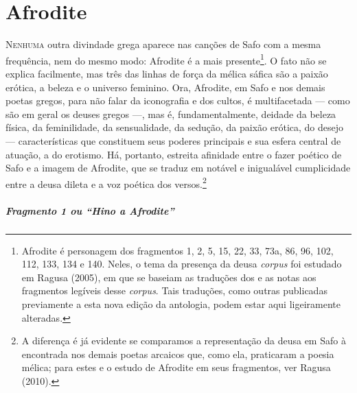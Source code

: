 \pagestyle{plain}



\chapter{Afrodite}

\textsc{Nenhuma} outra divindade grega aparece nas canções de Safo com a mesma
frequência, nem do mesmo modo: Afrodite é a mais presente\footnote{ Afrodite é
personagem dos fragmentos 1, 2, 5, 15, 22, 33, 73a, 86, 96, 102, 112, 133, 134
e 140. Neles, o tema da presença da deusa \textit{corpus} foi estudado em Ragusa (2005), em que se baseiam as traduções dos e as notas aos fragmentos legíveis desse \textit{corpus}. Tais traduções, como outras publicadas previamente a esta nova edição da antologia, podem estar aqui ligeiramente alteradas.}. O fato
não se explica facilmente, mas três das linhas de força da mélica sáfica são a
paixão erótica, a beleza e o universo feminino. Ora, Afrodite, em Safo e nos
demais poetas gregos, para não falar da iconografia e dos cultos, é
multifacetada --- como são em geral os deuses gregos ---, mas é, fundamentalmente,
deidade da beleza física, da feminilidade, da sensualidade, da sedução, da
paixão erótica, do desejo --- características que constituem seus poderes
principais e sua esfera central de atuação, a do erotismo. Há, portanto,
estreita afinidade entre o fazer poético de Safo e a imagem de Afrodite, que se
traduz em notável e inigualável cumplicidade entre a deusa dileta e a voz
poética dos versos.\footnote{ A diferença é já evidente se comparamos a
representação da deusa em Safo à encontrada nos demais poetas arcaicos que, como ela, praticaram a poesia mélica; para estes e o estudo de Afrodite em seus fragmentos, ver Ragusa (2010).}

\paragraph{Fragmento 1 ou “Hino a Afrodite”}

